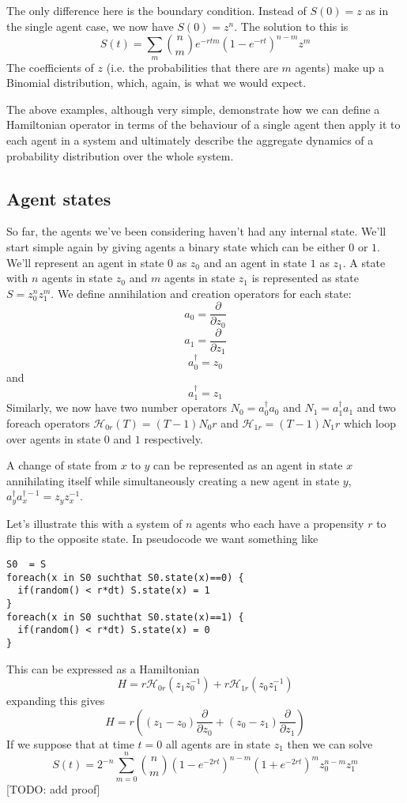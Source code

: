 \documentclass[letterpaper,twocolumn,10pt]{article}
\begin{document}
The only difference here is the boundary condition. Instead of $S(0) = z$ as in the single agent case, we now have $S(0) = z^n$. The solution to this is
\[
S(t) = \sum_m{n\choose m}e^{-rtm}(1-e^{-rt})^{n-m}z^m
\]
The coefficients of $z$ (i.e. the probabilities that there are $m$ agents) make up a Binomial distribution, which, again, is what we would expect.

The above examples, although very simple, demonstrate how we can define a Hamiltonian operator in terms of the behaviour of a single agent then apply it to each agent in a system and ultimately describe the aggregate dynamics of a probability distribution over the whole system.



\subsection{Agent states}

So far, the agents we've been considering haven't had any internal state. We'll start simple again by giving agents a binary state which can be either $0$ or $1$. We'll represent an agent in state $0$ as $z_0$ and an agent in state $1$ as $z_1$. A state with $n$ agents in state $z_0$ and $m$ agents in state $z_1$ is represented as state $S = z_0^nz_1^m$. We define annihilation and creation operators for each state:
\[
a_0 = \frac{\partial}{\partial z_0}
\]
\[
a_1 = \frac{\partial}{\partial z_1}
\]
\[
a_0^\dag = z_0
\]
and
\[
a_1^\dag = z_1
\]
Similarly, we now have two number operators $N_0 = a_0^\dag a_0$ and $N_1 = a_1^\dag a_1$ and two foreach operators $\mathcal{H}_{0r}(T) = (T-1)N_0r$ and $\mathcal{H}_{1r} = (T-1)N_1r$ which loop over agents in state $0$ and $1$ respectively.

A change of state from $x$ to $y$ can be represented as an agent in state $x$ annihilating itself while simultaneously creating a new agent in state $y$, $a_y^\dag a_x^{\dag-1} = z_yz_x^{-1}$.

Let's illustrate this with a system of $n$ agents who each have a propensity $r$ to flip to the opposite state. In pseudocode we want something like
\begin{verbatim}
S0  = S
foreach(x in S0 suchthat S0.state(x)==0) {
  if(random() < r*dt) S.state(x) = 1
}
foreach(x in S0 suchthat S0.state(x)==1) {
  if(random() < r*dt) S.state(x) = 0
}
\end{verbatim}
 This can be expressed as a Hamiltonian
\[
H = r\mathcal{H}_{0r}(z_1 z_0^{-1}) + r\mathcal{H}_{1r}(z_0 z_1^{-1})
\]
expanding this gives
\[
H = r\left((z_1 - z_0)\frac{\partial}{\partial z_0} + (z_0 - z_1)\frac{\partial}{\partial z_1}\right)
\]
If we suppose that at time $t = 0$ all agents are in state $z_1$ then we can solve
\[
S(t) = 2^{-n} \sum_{m=0}^n {n\choose m} (1-e^{-2rt})^{n-m}(1+e^{-2rt})^m z_0^{n-m}z_1^m
\]
[TODO: add proof]
\end{document}
